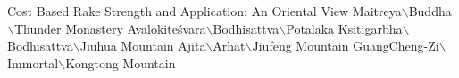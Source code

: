 \documentclass[twoside,doctor,numberorder]{zjuthesis}
\begin{document}

           {Cost Based Rake Strength and Application: An Oriental View}
  \zjureviewerone{}{}
  \zjureviewerone{}{}
  \zjureviewerone{}{}
  \zjureviewerone{}{}
  \zjureviewerone{}{}
                   {Maitreya$\backslash$Buddha$\backslash$Thunder Monastery}
                  {Avalokiteśvara$\backslash$Bodhisattva$\backslash$Potalaka}
                  {Ksitigarbha$\backslash$Bodhisattva$\backslash$Jiuhua Mountain}
                    {Ajita$\backslash$Arhat$\backslash$Jiufeng Mountain}
                   {GuangCheng-Zi$\backslash$Immortal$\backslash$Kongtong Mountain}
  \zjucommitteefive{}{}


  
  
  

  \frontmatter   

  
  
  

\end{document}
